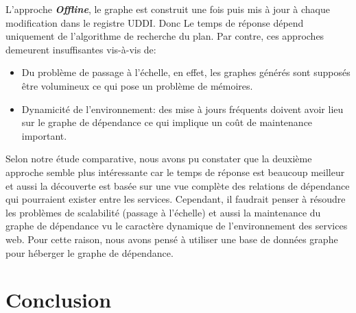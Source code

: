   L'approche \textbf{\textit{Offline}}, le graphe est construit une
  fois puis mis à jour à chaque modification dans le registre
  UDDI. Donc Le temps de réponse dépend uniquement de l'algorithme de
  recherche du plan. Par contre, ces approches demeurent insuffisantes
  vis-à-vis de:\medskip

  \SpecialItem
  \begin{itemize}
  \item Du problème de passage à l'échelle, en effet, les graphes
    générés sont supposés être volumineux ce qui pose un problème de
    mémoires.

  \item Dynamicité de l'environnement: des mise à jours fréquents
    doivent avoir lieu sur le graphe de dépendance ce qui implique un
    coût de maintenance important.\bigskip

  \end{itemize}
  \enddescription

\newpage

\newpage


Selon notre étude comparative, nous avons pu constater que la deuxième
approche semble plus intéressante car le temps de réponse est beaucoup
meilleur et aussi la découverte est basée sur une vue complète des
relations de dépendance qui pourraient exister entre les services.
Cependant, il faudrait penser à résoudre les problèmes de scalabilité
(passage à l'échelle) et aussi la maintenance du graphe de dépendance
vu le caractère dynamique de l'environnement des services web.  Pour
cette raison, nous avons pensé à utiliser une base de données graphe
pour héberger le graphe de dépendance.

\section*{Conclusion}
\label{sec:conclusion}
 

